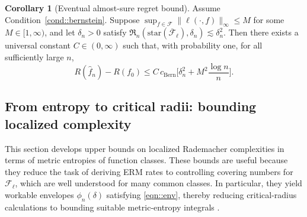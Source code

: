 \documentclass[11pt]{article}
\theoremstyle{plain}
\theoremstyle{definition} %
\newtheorem{corollary}{Corollary}
\begin{document}
 



\begin{corollary}[Eventual almost-sure regret bound]
\label{cor:genregret_as}
Assume Condition~\ref{cond::bernstein}. Suppose \(\sup_{f \in \mathcal{F}} \|\ell(\cdot, f)\|_{\infty} \leq M\) for some \(M \in [1, \infty)\), and let \(\delta_n>0\) satisfy
$\mathfrak{R}_n(\mathrm{star}(\overline{\mathcal{F}}_{\ell}),\delta_n)\lesssim \delta_n^2.$
Then there exists a universal constant \(C\in(0,\infty)\) such that, with probability one, for all sufficiently large \(n\),
\[
R(\hat f_n)-R(f_0)
\le
C\,c_{\mathrm{Bern}}\Biggl[
\delta_n^2
+
M^2\frac{\log n}{n}
\Biggr].
\]
\end{corollary}

 



\subsection{From entropy to critical radii: bounding localized complexity}
\label{sec:entropy}

This section develops upper bounds on localized Rademacher complexities in terms
of metric entropies of function classes. These bounds are useful because they
reduce the task of deriving ERM rates to controlling covering numbers for
\(\mathcal{F}_{\ell}\), which are well understood for many common classes. In
particular, they yield workable envelopes \(\phi_n(\delta)\) satisfying \eqref{eqn::env},
thereby reducing critical-radius calculations to bounding suitable metric-entropy
integrals \citep{lei2016local, wainwright2019high}.
\end{document}
